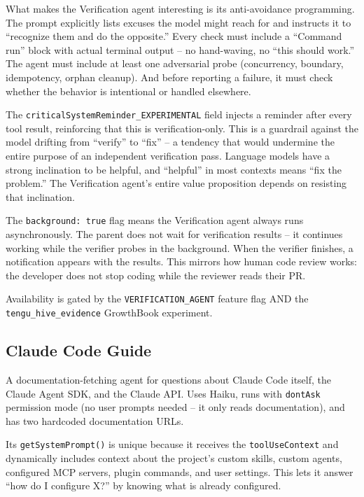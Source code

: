 \documentclass[
  english,
  11pt,
  letterpaper,
]{book}
\begin{document}
What makes the Verification agent interesting is its anti-avoidance
programming. The prompt explicitly lists excuses the model might reach
for and instructs it to ``recognize them and do the opposite.'' Every
check must include a ``Command run'' block with actual terminal output
-- no hand-waving, no ``this should work.'' The agent must include at
least one adversarial probe (concurrency, boundary, idempotency, orphan
cleanup). And before reporting a failure, it must check whether the
behavior is intentional or handled elsewhere.

The \texttt{criticalSystemReminder\_EXPERIMENTAL} field injects a
reminder after every tool result, reinforcing that this is
verification-only. This is a guardrail against the model drifting from
``verify'' to ``fix'' -- a tendency that would undermine the entire
purpose of an independent verification pass. Language models have a
strong inclination to be helpful, and ``helpful'' in most contexts means
``fix the problem.'' The Verification agent's entire value proposition
depends on resisting that inclination.

The \texttt{background:\ true} flag means the Verification agent always
runs asynchronously. The parent does not wait for verification results
-- it continues working while the verifier probes in the background.
When the verifier finishes, a notification appears with the results.
This mirrors how human code review works: the developer does not stop
coding while the reviewer reads their PR.

Availability is gated by the \texttt{VERIFICATION\_AGENT} feature flag
AND the \texttt{tengu\_hive\_evidence} GrowthBook experiment.

\subsection{Claude Code Guide}\label{claude-code-guide}

A documentation-fetching agent for questions about Claude Code itself,
the Claude Agent SDK, and the Claude API. Uses Haiku, runs with
\texttt{dontAsk} permission mode (no user prompts needed -- it only
reads documentation), and has two hardcoded documentation URLs.

Its \texttt{getSystemPrompt()} is unique because it receives the
\texttt{toolUseContext} and dynamically includes context about the
project's custom skills, custom agents, configured MCP servers, plugin
commands, and user settings. This lets it answer ``how do I configure
X?'' by knowing what is already configured.
\end{document}
